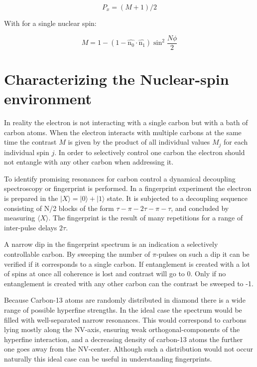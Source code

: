 \begin{equation}
P_x = (M+1)/2
\end{equation}

With for a single nuclear spin:

\begin{equation}
M = 1-(1 - \hat{\bm{\mathrm{n_0}}} \cdot \hat{\bm{\mathrm{n_1}}}) \sin^2 \frac{N\phi}{2}
\end{equation}

\section{Characterizing the Nuclear-spin environment}

In reality the electron is not interacting with a single carbon but with a bath of carbon atoms. When the electron interacts with multiple carbons at the same time the contrast $M$ is given by the product of all individual values $M_j$ for each individual spin $j$. In order to selectively control one carbon the electron should not entangle with any other carbon when addressing it.

To identify promising resonances for carbon control a dynamical decoupling spectroscopy\citep{Taminiau2012Detection} or fingerprint is performed. In a fingerprint experiment the electron is prepared in the $|X\rangle = |0\rangle +|1\rangle$ state. It is subjected to a decoupling sequence consisting of N/2 blocks of the form {$\tau - \pi -2\tau-\pi-\tau$}, and concluded by measuring $\langle X\rangle $. The fingerprint is the result of many repetitions for a range of inter-pulse delays $2\tau$.

A narrow dip in the fingerprint spectrum is an indication a selectively controllable carbon.
By sweeping the number of $\pi$-pulses on such a dip it can be verified if it corresponds to a single carbon. If entanglement is created with a lot of spins at once all coherence is lost and contrast will go to 0. Only if no entanglement is created with any other carbon can the contrast be sweeped to -1. %

Because Carbon-13 atoms are randomly distributed in diamond there is a wide range of possible hyperfine strengths. In the ideal case the spectrum would be filled with well-separated narrow resonances. This would correspond to carbons lying mostly along the NV-axis, ensuring weak orthogonal-components of the hyperfine interaction, and a decreasing density of carbon-13 atoms the further one goes away from the NV-center. Although such a distribution would not occur naturally this ideal case can be useful in understanding fingerprints.

